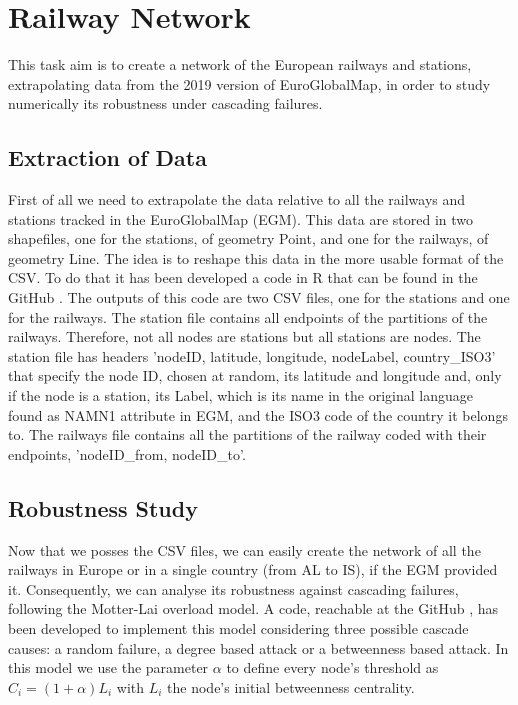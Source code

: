 \chapter{Railway Network}


This task aim is to create a network of the European railways and stations, extrapolating data from the 2019 version of EuroGlobalMap, in order to study numerically its robustness under cascading failures.

\section{Extraction of Data}


First of all we need to extrapolate the data relative to all the railways and stations tracked in the EuroGlobalMap (EGM). This data are stored in two shapefiles, one for the stations, of geometry Point, and one for the railways, of geometry Line. The idea is to reshape this data in the more usable format of the CSV. To do that it has been developed a code in R that can be found in the GitHub \cite{mygithub}. 
The outputs of this code are two CSV files, one for the stations and one for the railways. The station file contains all endpoints of the partitions of the railways. Therefore, not all nodes are stations but all stations are nodes. The station file has headers 'nodeID, latitude, longitude, nodeLabel, country\_ISO3' that specify the node ID, chosen at random, its latitude and longitude and, only if the node is a station, its Label, which is its name in the original language found as NAMN1 attribute in EGM, and the ISO3 code of the country it belongs to. 
The railways file contains all the partitions of the railway coded with their endpoints, 'nodeID\_from, nodeID\_to'.









\section{Robustness Study}

Now that we posses the CSV files, we can easily create the network of all the railways in Europe or in a single country (from AL to IS), if the EGM provided it. Consequently, we can analyse its robustness against cascading failures, following the Motter-Lai overload model. A code, reachable at the GitHub \cite{mygithub}, has been developed to implement this model considering three possible cascade causes: a random failure, a degree based attack or a betweenness based attack. In this model we use the parameter $\alpha$ to define every node's threshold as $C_i = (1+\alpha)L_i$ with $L_i$ the node's initial betweenness centrality.


